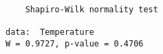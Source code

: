 \begin{verbatim} 

	Shapiro-Wilk normality test

data:  Temperature
W = 0.9727, p-value = 0.4706

\end{verbatim}